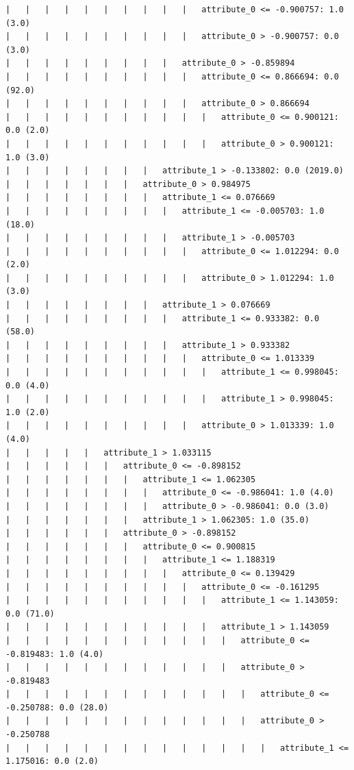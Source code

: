 \documentclass[a4paper]{article}
\theoremstyle{definition}
\newenvironment{soln}{
    \leavevmode\color{blue}\ignorespaces
}{}
\begin{document}
\begin{soln}
\begin{lstlisting}
|   |   |   |   |   |   |   |   |   |   attribute_0 <= -0.900757: 1.0 (3.0)
|   |   |   |   |   |   |   |   |   |   attribute_0 > -0.900757: 0.0 (3.0)
|   |   |   |   |   |   |   |   |   attribute_0 > -0.859894
|   |   |   |   |   |   |   |   |   |   attribute_0 <= 0.866694: 0.0 (92.0)
|   |   |   |   |   |   |   |   |   |   attribute_0 > 0.866694
|   |   |   |   |   |   |   |   |   |   |   attribute_0 <= 0.900121: 0.0 (2.0)
|   |   |   |   |   |   |   |   |   |   |   attribute_0 > 0.900121: 1.0 (3.0)
|   |   |   |   |   |   |   |   attribute_1 > -0.133802: 0.0 (2019.0)
|   |   |   |   |   |   |   attribute_0 > 0.984975
|   |   |   |   |   |   |   |   attribute_1 <= 0.076669
|   |   |   |   |   |   |   |   |   attribute_1 <= -0.005703: 1.0 (18.0)
|   |   |   |   |   |   |   |   |   attribute_1 > -0.005703
|   |   |   |   |   |   |   |   |   |   attribute_0 <= 1.012294: 0.0 (2.0)
|   |   |   |   |   |   |   |   |   |   attribute_0 > 1.012294: 1.0 (3.0)
|   |   |   |   |   |   |   |   attribute_1 > 0.076669
|   |   |   |   |   |   |   |   |   attribute_1 <= 0.933382: 0.0 (58.0)
|   |   |   |   |   |   |   |   |   attribute_1 > 0.933382
|   |   |   |   |   |   |   |   |   |   attribute_0 <= 1.013339
|   |   |   |   |   |   |   |   |   |   |   attribute_1 <= 0.998045: 0.0 (4.0)
|   |   |   |   |   |   |   |   |   |   |   attribute_1 > 0.998045: 1.0 (2.0)
|   |   |   |   |   |   |   |   |   |   attribute_0 > 1.013339: 1.0 (4.0)
|   |   |   |   |   attribute_1 > 1.033115
|   |   |   |   |   |   attribute_0 <= -0.898152
|   |   |   |   |   |   |   attribute_1 <= 1.062305
|   |   |   |   |   |   |   |   attribute_0 <= -0.986041: 1.0 (4.0)
|   |   |   |   |   |   |   |   attribute_0 > -0.986041: 0.0 (3.0)
|   |   |   |   |   |   |   attribute_1 > 1.062305: 1.0 (35.0)
|   |   |   |   |   |   attribute_0 > -0.898152
|   |   |   |   |   |   |   attribute_0 <= 0.900815
|   |   |   |   |   |   |   |   attribute_1 <= 1.188319
|   |   |   |   |   |   |   |   |   attribute_0 <= 0.139429
|   |   |   |   |   |   |   |   |   |   attribute_0 <= -0.161295
|   |   |   |   |   |   |   |   |   |   |   attribute_1 <= 1.143059: 0.0 (71.0)
|   |   |   |   |   |   |   |   |   |   |   attribute_1 > 1.143059
|   |   |   |   |   |   |   |   |   |   |   |   attribute_0 <= -0.819483: 1.0 (4.0)
|   |   |   |   |   |   |   |   |   |   |   |   attribute_0 > -0.819483
|   |   |   |   |   |   |   |   |   |   |   |   |   attribute_0 <= -0.250788: 0.0 (28.0)
|   |   |   |   |   |   |   |   |   |   |   |   |   attribute_0 > -0.250788
|   |   |   |   |   |   |   |   |   |   |   |   |   |   attribute_1 <= 1.175016: 0.0 (2.0)

\end{lstlisting}
\end{soln}
\end{document}
